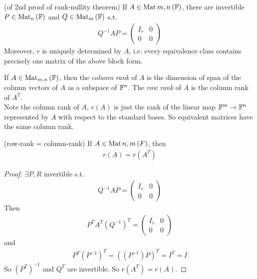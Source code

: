 \documentclass[a4paper]{article}
\begin{document}
\begin{coro} (of 2nd proof of rank-nullity theorem) If $A \in \operatorname{Mat}{m,n}\left(\mathbb{F}\right)$, there are invertible $P \in \operatorname{Mat}_n \left(\mathbb{F}\right)$ and $Q \in \operatorname{Mat}_m \left(\mathbb{F}\right)$ s.t.
\begin{equation*}
\begin{aligned}
Q^{-1}AP = \left(\begin{matrix}
I_r & 0\\
0 & 0
\end{matrix}
\right)
\end{aligned}
\end{equation*}
Moreover, $r$ is uniquely determined by $A$, i.e. every equivalence class contains precisely one matrix of the above block form.
\end{coro}

\begin{defi}
If $A \in \operatorname{Mat}_{m,n}\left(\mathbb{F}\right)$, then the \emph{column rank} of $A$ is the dimension of span of the column vectors of $A$ as a subspace of $\mathbb{F}^n$. The \emph{row rank} of $A$ is the column rank of $A^T$.\\
Note the column rank of $A$, $r\left(A\right)$ is just the rank of the linear map $\mathbb{F}^m \to \mathbb{F}^n$ represented by $A$ with respect to the standard bases. So equivalent matrices have the same column rank.
\end{defi}

\begin{coro} (row-rank = column-rank) If $A \in \operatorname{Mat}{n,m}\left(F\right)$, then
\begin{equation*}
\begin{aligned}
r\left(A\right) = r\left(A^T\right)
\end{aligned}
\end{equation*}
\begin{proof}
$\exists P,R$ invertible s.t.
\begin{equation*}
\begin{aligned}
Q^{-1}AP = \left(
\begin{matrix}
I_r & 0\\
0&0
\end{matrix}
\right)
\end{aligned}
\end{equation*}
Then
\begin{equation*}
\begin{aligned}
P^T A^T \left(Q^{-1}\right)^T = \left(
\begin{matrix}
I_r & 0\\
0&0
\end{matrix}
\right)
\end{aligned}
\end{equation*}
and
\begin{equation*}
\begin{aligned}
P^T\left(P^{-1}\right)^T = \left(\left(P^{-1}\right)P\right)^T = I^T = I
\end{aligned}
\end{equation*}
So $\left(P^T\right)^{-1}$ and $Q^T$ are invertible. So $r\left(A^T\right) = r\left(A\right)$.
\end{proof}
\end{coro}
\end{document}
